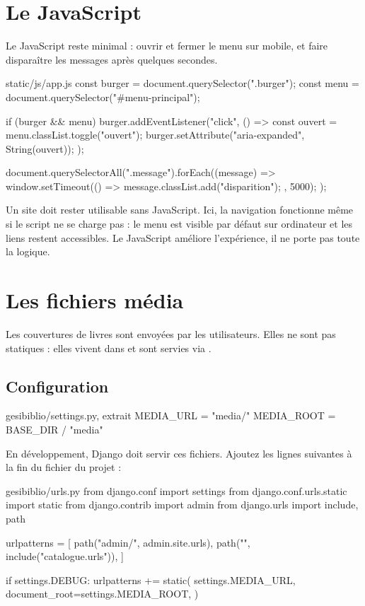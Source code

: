 \section{Le JavaScript}

Le JavaScript reste minimal : ouvrir et fermer le menu sur mobile, et faire
disparaître les messages après quelques secondes.

\begin{codebox}[javascript]{static/js/app.js}
const burger = document.querySelector(".burger");
const menu = document.querySelector("#menu-principal");

if (burger && menu) {
  burger.addEventListener("click", () => {
    const ouvert = menu.classList.toggle("ouvert");
    burger.setAttribute("aria-expanded", String(ouvert));
  });
}

document.querySelectorAll(".message").forEach((message) => {
  window.setTimeout(() => {
    message.classList.add("disparition");
  }, 5000);
});
\end{codebox}

\begin{bonne}
Un site doit rester utilisable sans JavaScript. Ici, la navigation fonctionne même
si le script ne se charge pas : le menu est visible par défaut sur ordinateur et
les liens restent accessibles. Le JavaScript améliore l'expérience, il ne porte
pas toute la logique.
\end{bonne}

\section{Les fichiers média}

Les couvertures de livres sont envoyées par les utilisateurs. Elles ne sont pas
statiques : elles vivent dans  et sont servies via
.

\subsection{Configuration}

\begin{codebox}[python]{gesibiblio/settings.py, extrait}
MEDIA_URL = "media/"
MEDIA_ROOT = BASE_DIR / "media"
\end{codebox}

En développement, Django doit servir ces fichiers. Ajoutez les lignes suivantes à
la fin du fichier  du projet :

\begin{codebox}[python]{gesibiblio/urls.py}
from django.conf import settings
from django.conf.urls.static import static
from django.contrib import admin
from django.urls import include, path

urlpatterns = [
    path("admin/", admin.site.urls),
    path("", include("catalogue.urls")),
]

if settings.DEBUG:
    urlpatterns += static(
        settings.MEDIA_URL,
        document_root=settings.MEDIA_ROOT,
    )
\end{codebox}


